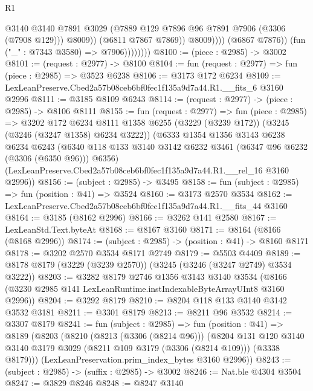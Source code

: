 \begin{lexlean}{R1}
\begin{coremodule}
                                  @3140
                                  @3140
                                  @7891
                                  @3029
                                  (@7889 @129 @7896 @96 @7891 @7906 (@3306 (@7908 @129)))
                                  @8009))
                              (@6811 @7867 @7869))
                            @8009))))
                    (@6867 @7876))
                  (fun ("_" : @7343 @3580) => @7906))))))))
@8100 := (piece : @2985) -> @3002
@8101 := (request : @2977) -> @8100
@8104 := fun (request : @2977) => fun (piece : @2985) => @3523 @6238
@8106 := @3173 @172 @6234
@8109 := LexLeanPreserve.Cbed2a57b08ceb6bf0fec1f135a9d7a44.R1.__fits_6 @3160 @2996
@8111 := @3185 @8109 @6243
@8114 := (request : @2977) -> (piece : @2985) -> @8106 @8111
@8155 := fun (request : @2977) =>
  fun (piece : @2985) =>
  @3202
    @172
    @6234
    @8111
    @1358
    @6255
    (@3229 (@3239 @172))
    (@3245 (@3246 (@3247 @1358) @6234 @3222))
    (@6333
      @1354
      @1356
      @3143
      @6238
      @6234
      @6243
      (@6340 @118 @133 @3140 @3142 @6232 @3461 (@6347 @96 @6232 (@3306 (@6350 @96))) @6356)
      (LexLeanPreserve.Cbed2a57b08ceb6bf0fec1f135a9d7a44.R1.__rel_16 @3160 @2996))
@8156 := (subject : @2985) -> @3495
@8158 := fun (subject : @2985) => fun (position : @41) => @3524
@8160 := @3173 @2570 @3534
@8162 := LexLeanPreserve.Cbed2a57b08ceb6bf0fec1f135a9d7a44.R1.__fits_44 @3160
@8164 := @3185 (@8162 @2996)
@8166 := @3262 @141 @2580
@8167 := LexLeanStd.Text.byteAt
@8168 := @8167 @3160
@8171 := @8164 (@8166 (@8168 @2996))
@8174 := (subject : @2985) -> (position : @41) -> @8160 @8171
@8178 := @3202 @2570 @3534 @8171 @2749
@8179 := @5503 @4409
@8189 := @8178 @8179 (@3229 (@3239 @2570)) (@3245 (@3246 (@3247 @2749) @3534 @3222))
@8203 := @3282
    @8179
    @2746
    @1356
    @3143
    @3140
    @3534
    (@8166 (@3230 @2985 @141 LexLeanRuntime.instIndexableByteArrayUInt8 @3160 @2996))
@8204 := @3292 @8179
@8210 := @8204 @118 @133 @3140 @3142 @3532 @3181
@8211 := @3301 @8179
@8213 := @8211 @96 @3532
@8214 := @3307 @8179
@8241 := fun (subject : @2985) =>
  fun (position : @41) =>
  @8189
    (@8203
      (@8210
        (@8213 (@3306 (@8214 @96)))
        (@8204
          @131
          @120
          @3140
          @3140
          @3179
          @3029
          (@8211 @109 @3179 (@3306 (@8214 @109)))
          (@3338 @8179)))
      (LexLeanPreservation.prim_index_bytes @3160 @2996))
@8243 := (subject : @2985) -> (suffix : @2985) -> @3002
@8246 := Nat.ble @4304 @3504
@8247 := @3829 @8246
@8248 := @8247 @3140

\end{coremodule}
\end{lexlean}
